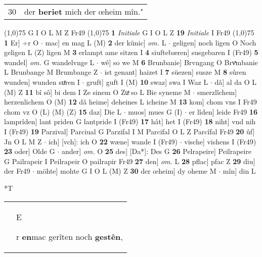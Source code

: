 \documentclass[8pt,a4paper,notitlepage]{article}
\begin{document}
\begin{table}[ht]
\begin{minipage}[t]{0.5\linewidth}
\begin{tabular}{rl}
30 & der \textbf{beriet} mich der œheim mîn."\\ 
\end{tabular}
\scriptsize
\line(1,0){75} \newline
G I O L M Z Fr49 \newline
\line(1,0){75} \newline
\textbf{1} \textit{Initiale} G I O L Z  \textbf{19} \textit{Initiale} I Fr49  \newline
\line(1,0){75} \newline
\textbf{1} Er] ÷r O  $\cdot$ mac] en mag L (M) \textbf{2} der künic] \textit{om.} L  $\cdot$ geligen] noch ligen O Noch geligen L (Z) ligen M \textbf{3} erlampt ame sitzen I \textbf{4} siuftebæren] susgebaren I (Fr49) \textbf{5} wandel] \textit{om.} G wandelvnge L  $\cdot$ wê] so we M \textbf{6} Brunbanie] Brvngang O Brvͯmbanie L Brunbange M Brumbange Z  $\cdot$ ist genant] haizet I \textbf{7} süezen] susze M \textbf{8} sûren wunden] wunden suͤren I  $\cdot$ gruft] guft I (M) \textbf{10} swaz] swa I Waz L  $\cdot$ dâ] al da O L (M) Z \textbf{11} bî sô] bi dem I Ze sinem O Zuͯ so L Bie syneme M  $\cdot$ smerzlîchem] herzenlichem O (M) \textbf{12} dâ heime] deheines L icheine M \textbf{13} kom] chom vns I Fr49 chom vz O (L) (M) (Z) \textbf{15} daz] Die L  $\cdot$ muos] mues G (I)  $\cdot$ er lîden] leide Fr49 \textbf{16} lamprîden] lant priden G lantpride I (Fr49) \textbf{17} hât] het I (Fr49) \textbf{18} niht] vnd nih I (Fr49) \textbf{19} Parzival] Parciual G Parzifal I M Parcifal O L Z Parcîfal Fr49 \textbf{20} ûf] Jn O L M Z  $\cdot$ ich] [vch]: ich O \textbf{22} wæne] wande I (Fr49)  $\cdot$ vische] vishens I (Fr49) \textbf{23} oder] Olde G  $\cdot$ ander] \textit{om.} O \textbf{25} des] [Da*]: Des G \textbf{26} Pelrapeire] Peilrapeire G Pailrapeir I Peilrapeir O pailrapir Fr49 \textbf{27} den] \textit{om.} L \textbf{28} pflac] pfac Z \textbf{29} diu] der Fr49  $\cdot$ möhte] mohte G I O L (M) Z \textbf{30} der œheim] dy oheme M  $\cdot$ mîn] din L \newline
\end{minipage}
\hspace{0.5cm}
\begin{minipage}[t]{0.5\linewidth}
\small
\begin{center}*T
\end{center}
\begin{tabular}{rl}
 & \begin{large}E\end{large}r \textbf{en}mac gerîten noch \textbf{gestên},\\ 

\end{tabular}
\end{minipage}
\end{table}
\end{document}
